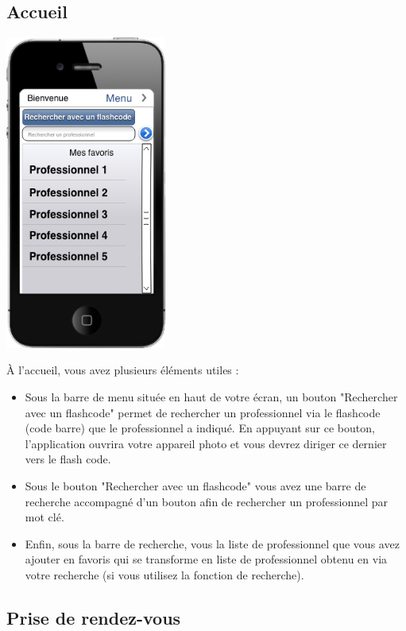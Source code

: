\documentclass{article}
\begin{document}
\subsection{Accueil} \label{Accueil}
\begin{center}
  \includegraphics[width=150pt]{Interfaces/accueuil}
\end{center}
À l'accueil, vous avez plusieurs éléments utiles :
\begin{itemize}
  \item Sous la barre de menu située en haut de votre écran, un bouton "Rechercher avec un flashcode" permet de rechercher un professionnel via le flashcode (code barre) que le professionnel a indiqué. En appuyant sur ce bouton, l'application ouvrira votre appareil photo et vous devrez diriger ce dernier vers le flash code.
  \item Sous le bouton "Rechercher avec un flashcode" vous avez une barre de recherche accompagné d'un bouton afin de rechercher un professionnel par mot clé.
  \item Enfin, sous la barre de recherche, vous la liste de professionnel que vous avez ajouter en favoris qui se transforme en liste de professionnel obtenu en via votre recherche (si vous utilisez la fonction de recherche).
\end{itemize}


\subsection{Prise de rendez-vous} \label{Prise de rendez-vous}
\end{document}
